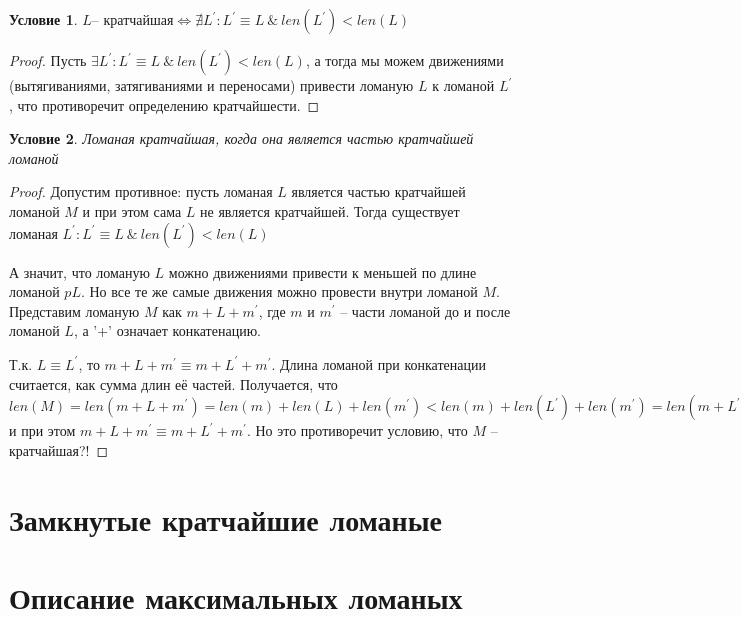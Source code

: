 \documentclass[12pt,a4paper, flushleft]{article}
\newtheorem{Con}{Условие}[section]
\newcommand{\p}[1]{#1^{\prime}}
\begin{document}
\begin{Con}
	$L \text{-- кратчайшая}\Longleftrightarrow\nexists \p L: \p L\equiv L ~\&~ len(\p L)<len(L)$
\end{Con}
\begin{proof}
	Пусть $\exists \p L: \p L\equiv L ~\&~ len(\p L)<len(L)$, а тогда мы можем движениями (вытягиваниями, затягиваниями и переносами) привести ломаную $L$  к ломаной $\p L$, что противоречит определению кратчайшести.
\end{proof}	

\begin{Con}
	Ломаная кратчайшая, когда она является частью кратчайшей ломаной
\end{Con}
\begin{proof}
	Допустим противное: пусть ломаная $L$ является частью кратчайшей ломаной $M$ и при этом сама $L$ не является кратчайшей. Тогда существует ломаная $\p L: \p L\equiv L~\&~ len(\p L)<len(L)$
	
	А значит, что ломаную $L$ можно движениями привести к меньшей по длине ломаной $p L$. Но все те же самые движения можно провести внутри ломаной $M$. Представим ломаную $M$ как $m + L + \p m$, где $m$ и $\p m$ -- части ломаной до и после ломаной $L$, а '+' означает конкатенацию. 
	
	Т.к. $L\equiv \p L$, то $m + L + \p m\equiv m+\p L + \p m$. Длина ломаной при конкатенации считается, как сумма длин её частей. Получается, что $len(M) = len(m+L+\p m) = len(m) + len(L) + len(\p m) < len(m) + len(\p L) + len(\p m) = len(m+\p L + \p m)$ и при этом $m+L+\p m\equiv m+\p L+\p m$. Но это противоречит условию, что $M$ -- кратчайшая?!
	
	
\end{proof}

\section{Замкнутые кратчайшие ломаные}

\section{Описание максимальных ломаных}
\end{document}
